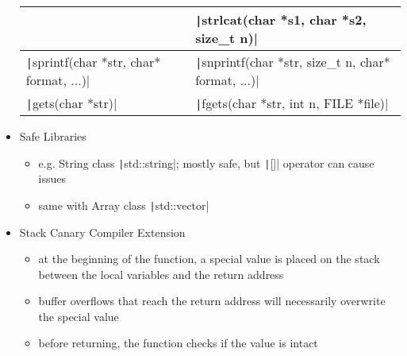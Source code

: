 \documentclass[final]{article}
\begin{document}
\begin{itemize}[nosep]
\begin{table}[H]
\begin{tabular}{ll}
                                                                                & \texttt|strlcat(char *s1, char *s2, size_t n)|                     \\\midrule
                  \texttt|sprintf(char *str, char* format, ...)|         & \texttt|snprintf(char *str, size_t n, char* format, ...)|          \\\midrule
                  \texttt|gets(char *str)|                               & \texttt|fgets(char *str, int n, FILE *file)|                       \\\bottomrule
              \end{tabular}
          \end{table}
    \item Safe Libraries
          \begin{itemize}[nosep]
              \item e.g. String class \texttt|std::string|; mostly safe, but \texttt|[]| operator can cause issues
              \item same with Array class \texttt|std::vector|
          \end{itemize}
    \item Stack Canary Compiler Extension
          \begin{itemize}[nosep]
              \item at the beginning of the function, a special value is placed on the stack between the local variables and the return address
              \item buffer overflows that reach the return address will necessarily overwrite the special value
              \item before returning, the function checks if the value is intact
          \end{itemize}
\end{itemize}
\end{document}
